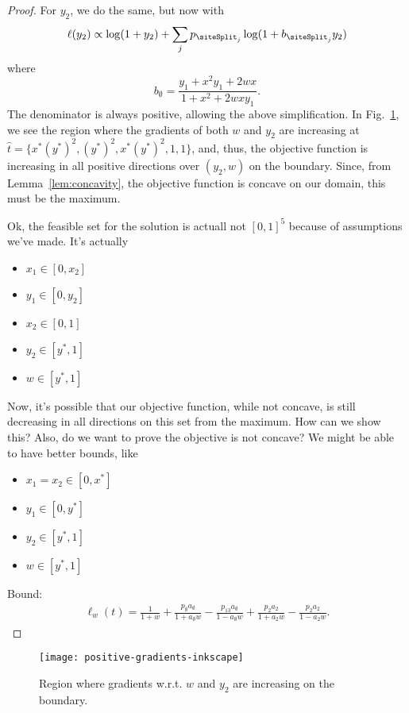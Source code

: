 \begin{proof}
For $y_2$, we do the same, but now with
\begin{align*}
\ell(y_2) \propto \log(1+y_2) + \sum_j p_{\siteSplit_j} \log(1 + b_{\siteSplit_j}y_2)
\end{align*}
where
\[
b_{\emptyset} = \frac{y_1+x^2y_1+2wx}{1+x^2+2wxy_1}.
\]
The denominator is always positive, allowing the above simplification.
In Fig.~\ref{fig:positive-gradients}, we see the region where the gradients of both $w$ and $y_2$ are increasing at $\hat{t}=\{x^*(y^*)^2, (y^*)^2, x^*(y^*)^2, 1, 1\}$, and, thus, the objective function is increasing in all positive directions over $(y_2,w)$ on the boundary.
Since, from Lemma~\ref{lem:concavity}, the objective function is concave on our domain, this must be the maximum.

Ok, the feasible set for the solution is actuall not $[0,1]^5$ because of assumptions we've made.
It's actually
\begin{itemize}
\item $x_1 \in [0,x_2]$
\item $y_1 \in [0,y_2]$
\item $x_2 \in [0,1]$
\item $y_2 \in [y^*,1]$
\item $w \in [y^*,1]$
\end{itemize}
Now, it's possible that our objective function, while not concave, is still decreasing in all directions on this set from the maximum.
How can we show this?
Also, do we want to prove the objective is not concave?
We might be able to have better bounds, like
\begin{itemize}
\item $x_1=x_2 \in [0,x^*]$
\item $y_1 \in [0,y^*]$
\item $y_2 \in [y^*,1]$
\item $w \in [y^*,1]$
\end{itemize}
Bound:
\begin{align*}
\ell_w(t) = \frac{1}{1+w} + \frac{p_{\emptyset}a_{\emptyset}}{1 + a_{\emptyset}w} - \frac{p_{13}a_{\emptyset}}{1 - a_{\emptyset}w} + \frac{p_{2}a_{2}}{1 + a_{2}w} - \frac{p_{2}a_{2}}{1 - a_{2}w}.
\end{align*}


\end{proof}

\begin{figure}
\centering
\texttt{[image: positive-gradients-inkscape]}
\caption{
Region where gradients w.r.t. $w$ and $y_2$ are increasing on the boundary.
}
\label{fig:positive-gradients}
\end{figure}

